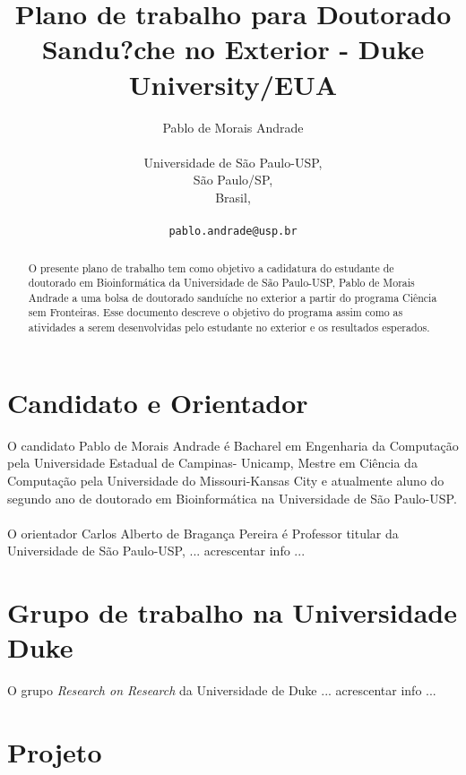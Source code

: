 \documentclass{article}
\title{Plano de trabalho para Doutorado Sandu?che no Exterior - Duke University/EUA}
\begin{document}
\author{Pablo de Morais Andrade\\\\
		Universidade de São Paulo-USP,\\
  		São Paulo/SP,\\
  		Brasil,\\\\
  \texttt{pablo.andrade@usp.br}}
\maketitle

\begin{abstract}
O presente plano de trabalho tem como objetivo a cadidatura do estudante de doutorado em Bioinformática da 
Universidade de São Paulo-USP, Pablo de Morais Andrade a uma bolsa de doutorado sanduíche no exterior 
a partir do programa Ciência sem Fronteiras. 
Esse documento descreve o objetivo do programa assim como as atividades a serem desenvolvidas pelo 
estudante no exterior e os resultados esperados.
\end{abstract}

\section{ \label{sec:projeto} Candidato e Orientador}
O candidato Pablo de Morais Andrade é Bacharel em Engenharia da Computação pela Universidade Estadual de Campinas-
Unicamp, Mestre em Ciência da Computação pela Universidade do Missouri-Kansas City e atualmente aluno do 
segundo ano de doutorado em Bioinformática na Universidade de São Paulo-USP.\\

\\
O orientador Carlos Alberto de Bragança Pereira é Professor titular da Universidade de São Paulo-USP, 
{\color{red} ... acrescentar info ...}

\section{ \label{sec:duke} Grupo de trabalho na Universidade Duke}
O grupo \textit{Research on Research} da Universidade de Duke {\color{red} ... acrescentar info ...}


\section{ \label{sec:projeto} Projeto}
\end{document}
